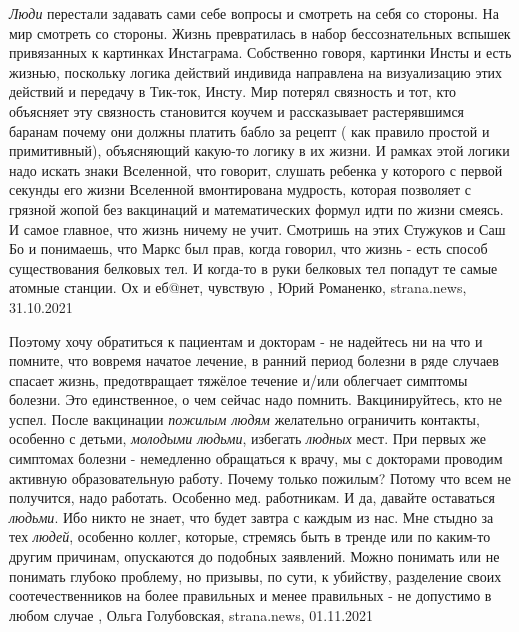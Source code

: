 \emph{Люди} перестали задавать сами себе вопросы и смотреть на себя со стороны. На мир
смотреть со стороны. Жизнь превратилась в набор бессознательных вспышек
привязанных к картинках Инстаграма. Собственно говоря, картинки Инсты и есть
жизнью, поскольку логика действий индивида направлена на визуализацию этих
действий и передачу в Тик-ток, Инсту. Мир потерял связность и тот, кто
объясняет эту связность становится коучем и рассказывает растерявшимся баранам
почему они должны платить бабло за рецепт ( как правило простой и примитивный),
объясняющий какую-то логику в их жизни. И рамках этой логики надо искать знаки
Вселенной, что говорит, слушать ребенка у которого с первой секунды его жизни
Вселенной вмонтирована мудрость, которая позволяет с грязной жопой без
вакцинаций и математических формул идти по жизни смеясь. И самое главное, что
жизнь ничему не учит. Смотришь на этих Стужуков и Саш Бо и понимаешь, что Маркс
был прав, когда говорил, что жизнь - есть способ существования белковых тел. И
когда-то в руки белковых тел попадут те самые атомные станции. Ох и еб@нет,
чувствую
, 
Юрий Романенко, strana.news, 31.10.2021

Поэтому хочу обратиться к пациентам и докторам - не надейтесь ни на что и
помните, что вовремя начатое лечение, в ранний период болезни в ряде случаев
спасает жизнь, предотвращает тяжёлое течение и/или облегчает симптомы болезни.
Это единственное, о чем сейчас надо помнить. Вакцинируйтесь, кто не успел.
После вакцинации \emph{пожилым людям} желательно ограничить контакты, особенно
с детьми, \emph{молодыми людьми}, избегать \emph{людных} мест. При первых же
симптомах болезни - немедленно обращаться к врачу, мы с докторами проводим
активную образовательную работу. Почему только пожилым? Потому что всем не
получится, надо работать. Особенно мед. работникам.  И да, давайте оставаться
\emph{людьми}. Ибо никто не знает, что будет завтра с каждым из нас. Мне стыдно
за тех \emph{людей}, особенно коллег, которые, стремясь быть в тренде или по
каким-то другим причинам, опускаются до подобных заявлений.  Можно понимать или
не понимать глубоко проблему, но призывы, по сути, к убийству, разделение своих
соотечественников на более правильных и менее правильных - не допустимо в любом
случае
, 
Ольга Голубовская, strana.news, 01.11.2021

